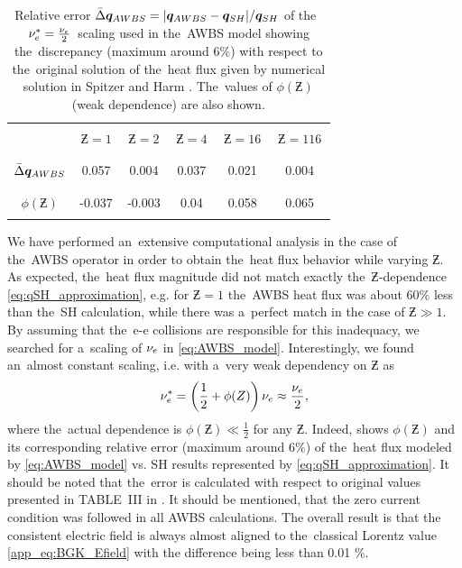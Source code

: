 \begin{table}
\begin{center}
  \begin{tabular}{c|ccccc}
    \hline\hline\\
    & $\,\Zbar=1\,$ & $\,\Zbar=2\,$ & $\,\Zbar=4\,$ & $\,\Zbar=16\,$ & $\,\Zbar=116\,$ \\\\
    \hline\\
    $\bar{\Delta}\boldsymbol{q}_{AWBS}$ & 0.057 & 0.004 & 0.037 & 0.021 & 0.004 \\\\
    \hline\\
    $\phi(\Zbar)$ & -0.037 & -0.003 & 0.04 & 0.058 & 0.065 \\\\ 
    \hline\hline
  \end{tabular}
  \caption{
  Relative error $\bar{\Delta}\boldsymbol{q}_{AWBS} = 
  |\boldsymbol{q}_{AWBS} - \boldsymbol{q}_{SH}| / \boldsymbol{q}_{SH}$ of 
  the~$\nu_{e}^* = \frac{\nu_{e}}{2}$~scaling used in the~AWBS model
   showing the~discrepancy 
  (maximum around 6$\%$) with respect to the~original solution of 
  the~heat flux given by numerical solution in Spitzer and Harm 
  \cite{SpitzerHarm_PR1953}. The~values of $\phi(\Zbar)$ (weak dependence) are 
  also shown. 
  }
\label{tab:qAWBS}
\end{center}
\end{table}

We have performed an~extensive computational analysis in the case of 
the~AWBS operator in order to obtain the~heat flux behavior while varying 
$\Zbar$. As expected, the~heat flux magnitude did not match exactly 
the~$\Zbar$-dependence \eqref{eq:qSH_approximation}, e.g. for $\Zbar=1$
the~AWBS heat flux was about 60$\%$ less than the~SH calculation, while
there was a~perfect match in the case of $\Zbar\gg1$. By assuming that the~e-e
collisions are responsible for this inadequacy, we searched for a~scaling of
$\nu_{e}$ in \eqref{eq:AWBS_model}. Interestingly, we found an~almost constant
scaling, i.e. with a~very weak dependency on $\Zbar$ as  
\begin{equation}
  \nu_{e}^* = \left(\frac{1}{2} + \phi(Z)\right) \nu_{e} \approx \frac{\nu_{e}}{2} ,
  \label{eq:qAWBS_approximation}
\end{equation}
where the~actual dependence is $\phi(\Zbar)\ll\frac{1}{2}$ for any $\Zbar$.
Indeed,  shows $\phi(\Zbar)$ and its corresponding relative
error (maximum around 6$\%$) of the~heat flux modeled by 
\eqref{eq:AWBS_model} vs. SH results represented by 
\eqref{eq:qSH_approximation}. It should be noted that the~error is calculated 
with respect to original values presented in TABLE~III in 
\cite{SpitzerHarm_PR1953}. It should be mentioned, that the zero current 
condition was followed in all AWBS calculations. The overall result is that
the consistent electric field is always almost aligned to the~classical Lorentz
value \eqref{app_eq:BGK_Efield} with the difference being less than 0.01 $\%$. 
 
